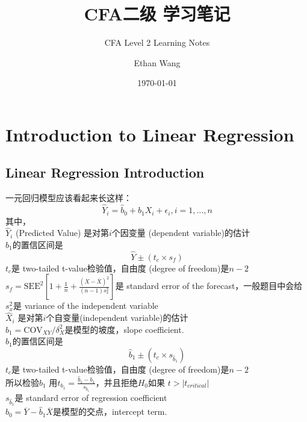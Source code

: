 \documentclass[cn,11pt,chinese]{elegantbook}
\title{CFA二级 学习笔记}
\subtitle{CFA Level 2 Learning Notes}
\author{Ethan Wang}
\institute{纽约大学}
\date{\today}
\begin{document}
\maketitle
\frontmatter

\tableofcontents

\mainmatter 
\chapter{Introduction to Linear Regression}

\section{Linear Regression Introduction}
    一元回归模型应该看起来长这样：
    \begin{equation}
        \hat Y_i = \hat b_0 + \hat b_1 X_i + \epsilon_i, i = 1,\dots, n
    \end{equation}
    其中，\\
    \indent \(\hat Y_i\) (Predicted Value) 是对第\(i\)个因变量 (dependent variable)的估计\\
    \indent \indent \(\hat b_1\)的置信区间是
        \[\hat Y \pm (t_c \times s_f)\]
    \indent \indent \indent \(t_c\)是 two-tailed t-value检验值，自由度 (degree of freedom)是\(n - 2\)\\ 
    \indent \indent \indent \(s_f = \text{SEE}^2 [1 + \frac{1}{n} + \frac{(X - \overline{X})^2}{(n - 1)s_x^2}]\)是 standard error of the forecast，一般题目中会给\\ 
    \indent \indent \indent \indent \(s_x^2\)是 variance of the independent variable\\
    \indent \(\hat X_i\) 是对第\(i\)个自变量(independent variable)的估计\\
    \indent \(\hat b_1 = \text{COV}_{XY} / \delta_X^2\)是模型的坡度，slope coefficient.\\
    \indent \indent \(\hat b_1\)的置信区间是
        \[ \hat b_1 \pm (t_c \times s_{\hat b_1}) \] 
    \indent \indent \indent \(t_c\)是 two-tailed t-value检验值，自由度 (degree of freedom)是\(n - 2\)\\ 
    \indent \indent \indent \indent 所以检验\(\hat b_1\) 用\(t_{b_1} = \frac{\hat b_1 - b_1}{s_{\hat b_1}}\)，并且拒绝\(H_0\)如果 \(t > |t_{critical}|\)\\ 
    \indent \indent \indent \(s_{\hat b_1}\)是 standard error of regression coefficient\\
    \indent \(\hat b_0 = \overline{Y} - \hat b_1 \overline{X}\)是模型的交点，intercept term.
\end{document}
